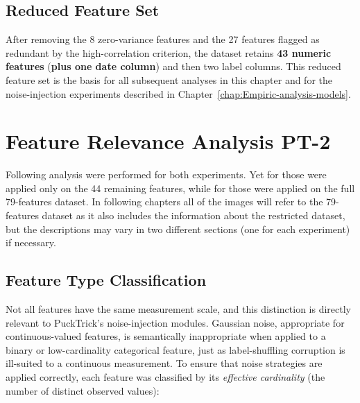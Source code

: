 \documentclass[../main.tex]{subfiles}
\begin{document}
\subsection{Reduced Feature Set}
\label{sec:reduced-feature-set}

After removing the 8 zero-variance features and the 27 features flagged as redundant by the high-correlation criterion, the dataset retains \textbf{43 numeric features} (\textbf{plus one date column}) and then two label columns. This reduced feature set is the basis for all subsequent analyses in this chapter and for the noise-injection experiments described in Chapter~\ref{chap:Empiric-analysis-models}.


\newpage
\section{Feature Relevance Analysis PT-2}
\label{sec:feature-relevance-PT2}

Following analysis were performed for both experiments. Yet for  those were applied only on the 44 remaining features, while for  those were applied on the full 79-features dataset. In following chapters all of the images will refer to the 79-features dataset as it also includes the information about the restricted dataset, but the descriptions may vary in two different sections (one for each experiment) if necessary.


\subsection{Feature Type Classification}
\label{sec:feature-types}

Not all features have the same measurement scale, and this
distinction is directly relevant to PuckTrick's noise-injection modules.
Gaussian noise, appropriate for continuous-valued features, is semantically
inappropriate when applied to a binary or low-cardinality categorical feature,
just as label-shuffling corruption is ill-suited to a continuous measurement.
To ensure that noise strategies are applied correctly, each feature was
classified by its \emph{effective cardinality} (the number of distinct observed
values):
\end{document}
